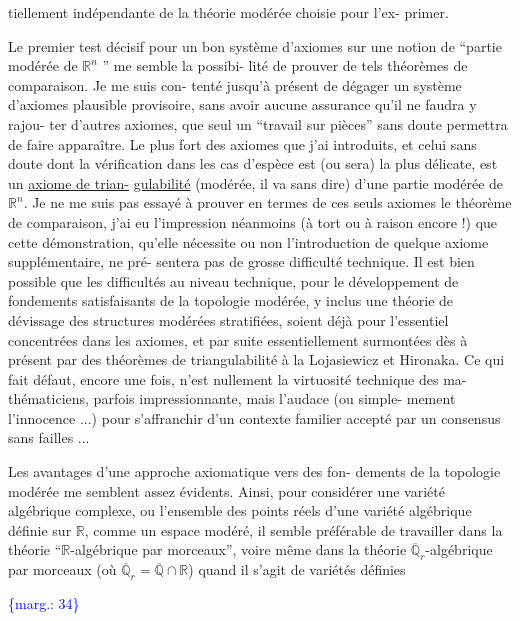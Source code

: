 \documentclass[11pt]{article}
\newcommand{\scanpage}[1]{\par\bigskip\noindent{\small\sffamily[scan #1]}\par}
\newcommand{\mspage}[1]{{\small\sffamily[p.\,#1]}}
\newcommand{\margin}[1]{\textcolor{blue}{\{\textsf{marg.:} #1\}}}
\newcommand{\uline}[1]{\underline{#1}}
\begin{document}
tiellement indépendante de la théorie modérée choisie pour l'ex-%
primer.

Le premier test décisif pour un bon système d'axiomes
sur une notion de ``partie modérée de $\mathbb{R}^n$ '' me semble la possibi-%
lité de prouver de tels théorèmes de comparaison. Je me suis con-%
tenté jusqu'à présent de dégager un système d'axiomes plausible
provisoire, sans avoir aucune assurance qu'il ne faudra y rajou-%
ter d'autres axiomes, que seul un ``travail sur pièces'' sans doute
permettra de faire apparaître. Le plus fort des axiomes que j'ai
introduits, et celui sans doute dont la vérification dans les cas
d'espèce est (ou sera) la plus délicate, est un \uline{axiome de trian-}%
\uline{gulabilité} (modérée, il va sans dire) d'une partie modérée de $\mathbb{R}^n$.
Je ne me suis pas essayé à prouver en termes de ces seuls axiomes
le théorème de comparaison, j'ai eu l'impression néanmoins (à tort
ou à raison encore !) que cette démonstration, qu'elle nécessite
ou non l'introduction de quelque axiome supplémentaire, ne pré-%
sentera pas de grosse difficulté technique. Il est bien possible
que les difficultés au niveau technique, pour le développement
de fondements satisfaisants de la topologie modérée, y inclus une
théorie de dévissage des structures modérées stratifiées, soient
déjà pour l'essentiel concentrées dans les axiomes, et par suite
essentiellement surmontées dès à présent par des théorèmes de
triangulabilité à la Lojasiewicz et Hironaka. Ce qui fait défaut,
encore une fois, n'est nullement la virtuosité technique des ma-%
thématiciens, parfois impressionnante, mais l'audace (ou simple-%
mement l'innocence ...) pour s'affranchir d'un contexte familier
accepté par un consensus sans failles ...

Les avantages d'une approche axiomatique vers des fon-%
dements de la topologie modérée me semblent assez évidents. Ainsi,
pour considérer une variété algébrique complexe, ou l'ensemble des
points réels d'une variété algébrique définie sur $\mathbb{R}$, comme un
espace modéré, il semble préférable de travailler dans la théorie
``$\mathbb{R}$-algébrique par morceaux'', voire même dans la théorie $\overline{\mathbb{Q}}_r$-algébrique
par morceaux (où $\overline{\mathbb{Q}}_r = \overline{\mathbb{Q}} \cap \mathbb{R}$) quand il s'agit de variétés définies

\margin{34}

\clearpage
\scanpage{119/35}
\mspage{33}
\end{document}
